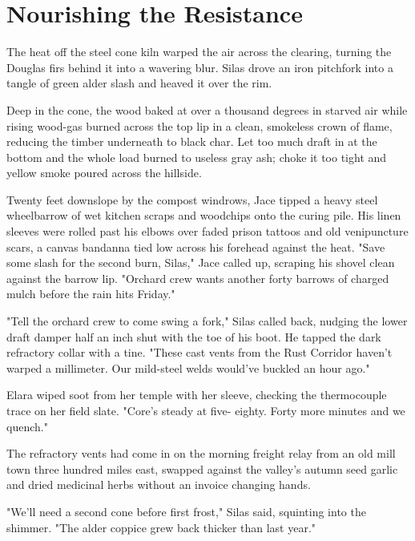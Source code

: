 \chapter{Nourishing the Resistance}











The heat off the steel cone kiln warped the air across the clearing, turning the Douglas firs behind it into a wavering blur. Silas drove an iron pitchfork into a tangle of green alder slash and heaved it over the rim.

Deep in the cone, the wood baked at over a thousand degrees in starved air while rising wood-gas burned across the top lip in a clean, smokeless crown of flame, reducing the timber underneath to black char. Let too much draft in at the bottom and the whole load burned to useless gray ash; choke it too tight and yellow smoke poured across the hillside.

Twenty feet downslope by the compost windrows, Jace tipped a heavy steel wheelbarrow of wet kitchen scraps and woodchips onto the curing pile. His linen sleeves were rolled past his elbows over faded prison tattoos and old venipuncture scars, a canvas bandanna tied low across his forehead against the heat. "Save some slash for the second burn, Silas," Jace called up, scraping his shovel clean against the barrow lip. "Orchard crew wants another forty barrows of charged mulch before the rain hits Friday."

"Tell the orchard crew to come swing a fork," Silas called back, nudging the lower draft damper half an inch shut with the toe of his boot. He tapped the dark refractory collar with a tine. "These cast vents from the Rust Corridor haven't warped a millimeter. Our mild-steel welds would've buckled an hour ago."

Elara wiped soot from her temple with her sleeve, checking the thermocouple trace on her field slate. "Core's steady at five- eighty. Forty more minutes and we quench."

The refractory vents had come in on the morning freight relay from an old mill town three hundred miles east, swapped against the valley's autumn seed garlic and dried medicinal herbs without an invoice changing hands.

"We'll need a second cone before first frost," Silas said, squinting into the shimmer. "The alder coppice grew back thicker than last year."

